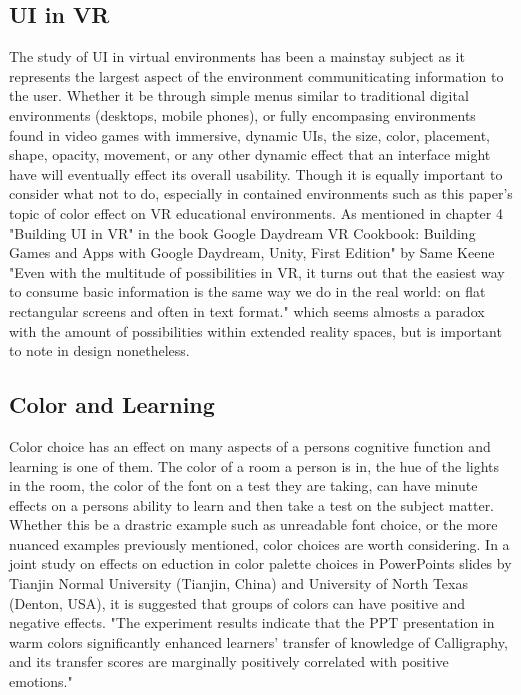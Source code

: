 \documentclass[acmlarge]{acmart}
\begin{document}
\subsection{UI in VR}
The study of UI in virtual environments has been a mainstay subject as it represents the largest aspect of the environment communiticating information to the user.
Whether it be through simple menus similar to traditional digital environments (desktops, mobile phones), or fully encompasing environments found in video games with immersive, dynamic UIs,
the size, color, placement, shape, opacity, movement, or any other dynamic effect that an interface might have will eventually effect its overall usability. Though it is equally important to consider what not to do, especially in contained environments such as this paper's topic of color effect on VR educational environments. As mentioned in chapter 4 "Building UI in VR" in the book Google Daydream VR Cookbook: Building Games and Apps with Google Daydream, Unity, First Edition" by Same Keene "Even with the multitude of possibilities in VR, it turns out that the easiest way to consume basic information is the same way we do in the real world: on flat rectangular screens and often in text format." \cite{keene2018building} which seems almosts a paradox with the amount of possibilities within extended reality spaces, but is important to note in design nonetheless.


\subsection{Color and Learning}
Color choice has an effect on many aspects of a persons cognitive function and learning is one of them. The color of a room a person is in, the hue of the lights in the room, the color of the font on a test they are taking, can have minute effects on a persons ability to learn and then take a test on the subject matter. Whether this be a drastric example such as unreadable font choice, or the more nuanced examples previously mentioned, color choices are worth considering. In a joint study on effects on eduction in color palette choices in PowerPoints slides by 
Tianjin Normal University (Tianjin, China) and University of North Texas (Denton, USA), it is suggested that groups of colors can have positive and negative effects. "The experiment results indicate that the PPT presentation in warm colors significantly enhanced learners' transfer of knowledge of Calligraphy, and its transfer scores are marginally positively correlated with positive emotions." \cite{yang2021effect}
\end{document}
